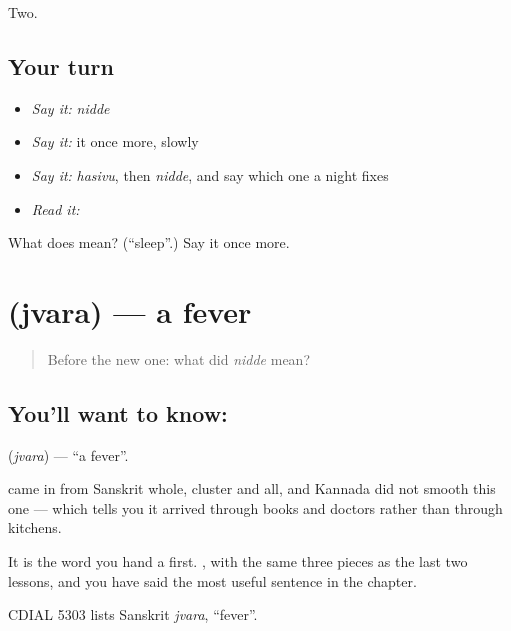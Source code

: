 \begin{grammarlens}[title={What you've built}]
Two.
\end{grammarlens}

\subsection*{Your turn}
\begin{itemize}
\raggedright
  \item \emph{Say it:} \emph{nidde}
  \item \emph{Say it:} it once more, slowly
  \item \emph{Say it:} \emph{hasivu}, then \emph{nidde}, and say which one a night fixes
  \item \emph{Read it:} \textbf{}
\end{itemize}

\begin{tcolorbox}[breakable,colback=teal!4,colframe=teal!35!black,title={Before you move on}]
What does  mean? (\textquotedblleft{}sleep\textquotedblright{}.) Say it once more.
\end{tcolorbox}
\section[\texorpdfstring{\kn{ಜ್ವರ} (jvara)}{ಜ್ವರ (jvara)}]{ (jvara) — a fever}

\label{lesson:KA-C63-fever}



\begin{quote}
Before the new one: what did \emph{nidde} mean?
\end{quote}

\subsection*{You'll want to know: }
\textbf{} (\emph{jvara}) — \textquotedblleft{}a fever\textquotedblright{}.

 came in from Sanskrit whole, cluster and all, and Kannada did not smooth this one — which tells you it arrived through books and doctors rather than through kitchens.

It is the word you hand a  first.  , with the same three pieces as the last two lessons, and you have said the most useful sentence in the chapter.

CDIAL 5303 lists Sanskrit \emph{jvara}, \textquotedblleft{}fever\textquotedblright{}.

